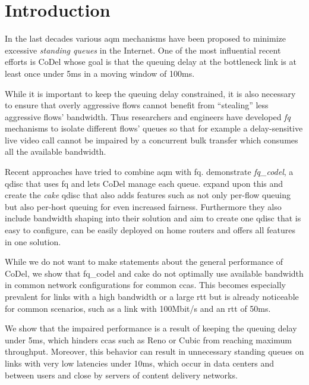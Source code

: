 \documentclass[10pt,sigconf,letterpaper,dvipsnames\ifx\removeHeaders\tempYes ,nonacm\fi]{acmart}
\newcommand{\codel}{CoDel}
\begin{document}
\maketitle

\section{Introduction}

In the last decades various \gls{aqm} mechanisms have been proposed to minimize excessive \textit{standing queues} in the Internet. One of the most influential recent efforts is \codel{} \cite{nichols_controlling_2012} whose goal is that the queuing delay at the bottleneck link is at least once under 5\;ms in a moving window of 100\;ms. 

While it is important to keep the queuing delay constrained, it is also necessary to ensure that overly aggressive flows cannot benefit from ``stealing'' less aggressive flows' bandwidth. Thus researchers and engineers have developed \textit{\gls{fq}} mechanisms \cite{shreedhar_efficient_1996,dumazet_pkt_sched:_2013} to isolate different flows' queues so that for example a delay-sensitive live video call cannot be impaired by a concurrent bulk transfer which consumes all the available bandwidth. 

Recent approaches have tried to combine \gls{aqm} with \gls{fq}. \cite{taht_flow_2018} demonstrate \textit{fq\_codel}, a \gls{qdisc} that uses \gls{fq} and lets \codel{} manage each queue. \cite{hoiland-jorgensen_piece_2018} expand upon this and create the \textit{cake} \gls{qdisc} that also adds features such as not only per-flow queuing but also per-host queuing for even increased fairness. Furthermore they also include bandwidth shaping into their solution and aim to create one \gls{qdisc} that is easy to configure, can be easily deployed on home routers and offers all features in one solution. 

While we do not want to make statements about the general performance of \codel{}, we show that fq\_codel and cake do not optimally use available bandwidth in common network configurations for common \glspl{cca}. This becomes especially prevalent for links with a high bandwidth or a large \gls{rtt} but is already noticeable for common scenarios, such as a link with 100\;Mbit/s and an \gls{rtt} of 50\;ms. 

We show that the impaired performance is a result of keeping the queuing delay under 5\;ms, which hinders \glspl{cca} such as Reno or Cubic from reaching maximum throughput. Moreover, this behavior can result in unnecessary standing queues on links with very low latencies under 10\;ms, which occur in data centers and between users and close by servers of content delivery networks. 
\end{document}
